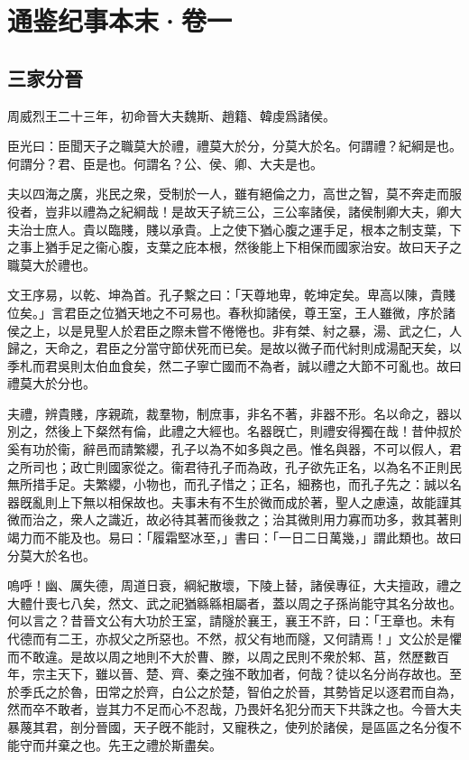 \chapter{通鉴纪事本末·卷一}
\label{chap:vol1}

\section{三家分晉}
\label{sec:san-jia-fen-jin}



周威烈王二十三年，初命晉大夫魏斯、趙籍、韓虔爲諸侯。

    臣光曰：臣聞天子之職莫大於禮，禮莫大於分，分莫大於名。何謂禮？紀綱是也。何謂分？君、臣是也。何謂名？公、侯、卿、大夫是也。

    夫以四海之廣，兆民之衆，受制於一人，雖有絕倫之力，高世之智，莫不奔走而服役者，豈非以禮為之紀綱哉！是故天子統三公，三公率諸侯，諸侯制卿大夫，卿大夫治士庶人。貴以臨賤，賤以承貴。上之使下猶心腹之運手足，根本之制支葉，下之事上猶手足之衞心腹，支葉之庇本根，然後能上下相保而國家治安。故曰天子之職莫大於禮也。

    文王序易，以乾、坤為首。孔子繫之曰：「天尊地卑，乾坤定矣。卑高以陳，貴賤位矣。」言君臣之位猶天地之不可易也。春秋抑諸侯，尊王室，王人雖微，序於諸侯之上，以是見聖人於君臣之際未嘗不惓惓也。非有桀、紂之暴，湯、武之仁，人歸之，天命之，君臣之分當守節伏死而已矣。是故以微子而代紂則成湯配天矣，以季札而君吳則太伯血食矣，然二子寧亡國而不為者，誠以禮之大節不可亂也。故曰禮莫大於分也。

    夫禮，辨貴賤，序親疏，裁羣物，制庶事，非名不著，非器不形。名以命之，器以別之，然後上下粲然有倫，此禮之大經也。名器旣亡，則禮安得獨在哉！昔仲叔於奚有功於衞，辭邑而請繁纓，孔子以為不如多與之邑。惟名與器，不可以假人，君之所司也；政亡則國家從之。衞君待孔子而為政，孔子欲先正名，以為名不正則民無所措手足。夫繁纓，小物也，而孔子惜之；正名，細務也，而孔子先之：誠以名器旣亂則上下無以相保故也。夫事未有不生於微而成於著，聖人之慮遠，故能謹其微而治之，衆人之識近，故必待其著而後救之；治其微則用力寡而功多，救其著則竭力而不能及也。易曰：「履霜堅冰至，」書曰：「一日二日萬幾，」謂此類也。故曰分莫大於名也。

    嗚呼！幽、厲失德，周道日衰，綱紀散壞，下陵上替，諸侯專征，大夫擅政，禮之大體什喪七八矣，然文、武之祀猶緜緜相屬者，蓋以周之子孫尚能守其名分故也。何以言之？昔晉文公有大功於王室，請隧於襄王，襄王不許，曰：「王章也。未有代德而有二王，亦叔父之所惡也。不然，叔父有地而隧，又何請焉！」文公於是懼而不敢違。是故以周之地則不大於曹、滕，以周之民則不衆於邾、莒，然歷數百年，宗主天下，雖以晉、楚、齊、秦之強不敢加者，何哉？徒以名分尚存故也。至於季氏之於魯，田常之於齊，白公之於楚，智伯之於晉，其勢皆足以逐君而自為，然而卒不敢者，豈其力不足而心不忍哉，乃畏奸名犯分而天下共誅之也。今晉大夫暴蔑其君，剖分晉國，天子旣不能討，又寵秩之，使列於諸侯，是區區之名分復不能守而幷棄之也。先王之禮於斯盡矣。

